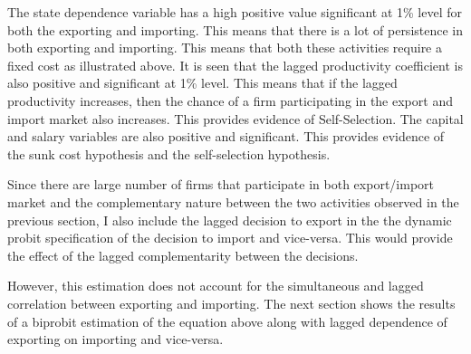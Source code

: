 \documentclass[11pt]{article}
\begin{document}
The state dependence variable has a high positive value significant at
1\% level for both the exporting and importing. This means that there
is a lot of persistence in both exporting and importing. This means
that both these activities require a fixed cost as illustrated
above. It is seen that the lagged productivity coefficient is also
positive and significant at 1\% level. This means that if the lagged
productivity increases, then the chance of a firm participating in the
export and import market also increases. This provides evidence of
Self-Selection. The capital and salary variables are also positive and
significant. This provides evidence of the sunk cost hypothesis and
the self-selection hypothesis. 

Since there are large number of firms that participate in both
export/import market and the complementary nature between the two
activities observed in the previous section,  I also include the lagged decision to export in
the the dynamic probit specification of the decision to import and
vice-versa. This would provide the effect of the lagged complementarity
between the decisions. 

However, this estimation does not
account for the simultaneous and lagged correlation between exporting
and importing. The next section shows the results of a biprobit
estimation of the equation above along with lagged dependence of
exporting on importing and vice-versa. 


  
% 
% 
\end{document}
